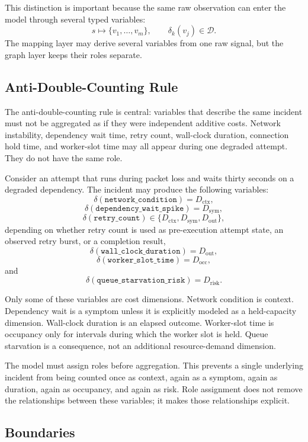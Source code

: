 This distinction is important because the same raw observation can enter the
model through several typed variables:
\[
s
\mapsto
\{v_1,\ldots,v_m\},
\qquad
\delta_k(v_j)\in\mathcal{D}.
\]
The mapping layer may derive several variables from one raw signal, but the
graph layer keeps their roles separate.

\subsection{Anti-Double-Counting Rule}
\label{sec:influence-domain-anti-double-counting}

The anti-double-counting rule is central: variables that describe the same
incident must not be aggregated as if they were independent additive costs.
Network instability, dependency wait time, retry count, wall-clock duration,
connection hold time, and worker-slot time may all appear during one degraded
attempt. They do not have the same role.

Consider an attempt that runs during packet loss and waits thirty seconds on a
degraded dependency. The incident may produce the following variables:
\[
\delta(\texttt{network\_condition}) = D_{\mathrm{ctx}},
\]
\[
\delta(\texttt{dependency\_wait\_spike}) = D_{\mathrm{sym}},
\]
\[
\delta(\texttt{retry\_count}) \in \{D_{\mathrm{ctx}},D_{\mathrm{sym}},D_{\mathrm{out}}\},
\]
depending on whether retry count is used as pre-execution attempt state, an
observed retry burst, or a completion result,
\[
\delta(\texttt{wall\_clock\_duration}) = D_{\mathrm{out}},
\]
\[
\delta(\texttt{worker\_slot\_time}) = D_{\mathrm{occ}},
\]
and
\[
\delta(\texttt{queue\_starvation\_risk}) = D_{\mathrm{risk}}.
\]

Only some of these variables are cost dimensions. Network condition is context.
Dependency wait is a symptom unless it is explicitly modeled as a held-capacity
dimension. Wall-clock duration is an elapsed outcome. Worker-slot time is
occupancy only for intervals during which the worker slot is held. Queue
starvation is a consequence, not an additional resource-demand dimension.

The model must assign roles before aggregation. This prevents a single
underlying incident from being counted once as context, again as a symptom,
again as duration, again as occupancy, and again as risk. Role assignment does
not remove the relationships between these variables; it makes those
relationships explicit.

\subsection{Boundaries}
\label{sec:influence-domain-boundaries}

